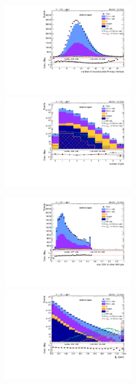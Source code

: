 \begin{figure}[!htb]
  \begin{center}  
    \includegraphics[width=0.495\textwidth]{plots/v9_thesis/XVZnnInc/nPV.pdf}
    \includegraphics[width=0.495\textwidth]{plots/v9_thesis/XVZnnInc/nJets.pdf}

    \includegraphics[width=0.495\textwidth]{plots/v9_thesis/XVZnnInc/MaxJetBTag.pdf}
    \includegraphics[width=0.495\textwidth]{plots/v9_thesis/XVZnnInc/MEt_pt.pdf}


\end{center}
\end{figure}
